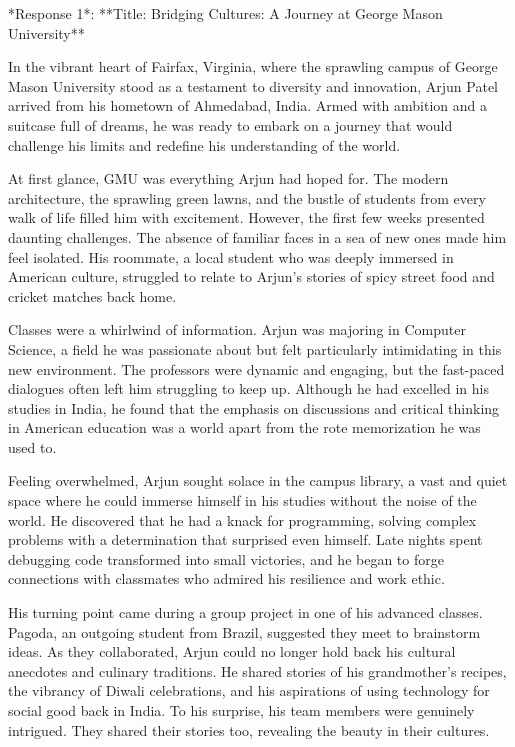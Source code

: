 \documentclass[11pt,addpoints,answers]{exam}
\begin{document}
\begin{questions}
\begin{tcolorbox}[fit,height=22cm, width=16cm, blank, borderline={1pt}{-2pt},nobeforeafter]
\pagebreak

*Response 1*:  **Title: Bridging Cultures: A Journey at George Mason University**

In the vibrant heart of Fairfax, Virginia, where the sprawling campus of George Mason University stood as a testament to diversity and innovation, Arjun Patel arrived from his hometown of Ahmedabad, India. Armed with ambition and a suitcase full of dreams, he was ready to embark on a journey that would challenge his limits and redefine his understanding of the world.

At first glance, GMU was everything Arjun had hoped for. The modern architecture, the sprawling green lawns, and the bustle of students from every walk of life filled him with excitement. However, the first few weeks presented daunting challenges. The absence of familiar faces in a sea of new ones made him feel isolated. His roommate, a local student who was deeply immersed in American culture, struggled to relate to Arjun's stories of spicy street food and cricket matches back home.

Classes were a whirlwind of information. Arjun was majoring in Computer Science, a field he was passionate about but felt particularly intimidating in this new environment. The professors were dynamic and engaging, but the fast-paced dialogues often left him struggling to keep up. Although he had excelled in his studies in India, he found that the emphasis on discussions and critical thinking in American education was a world apart from the rote memorization he was used to.

Feeling overwhelmed, Arjun sought solace in the campus library, a vast and quiet space where he could immerse himself in his studies without the noise of the world. He discovered that he had a knack for programming, solving complex problems with a determination that surprised even himself. Late nights spent debugging code transformed into small victories, and he began to forge connections with classmates who admired his resilience and work ethic.

His turning point came during a group project in one of his advanced classes. Pagoda, an outgoing student from Brazil, suggested they meet to brainstorm ideas. As they collaborated, Arjun could no longer hold back his cultural anecdotes and culinary traditions. He shared stories of his grandmother's recipes, the vibrancy of Diwali celebrations, and his aspirations of using technology for social good back in India. To his surprise, his team members were genuinely intrigued. They shared their stories too, revealing the beauty in their cultures.


\end{tcolorbox}
\end{questions}
\end{document}
